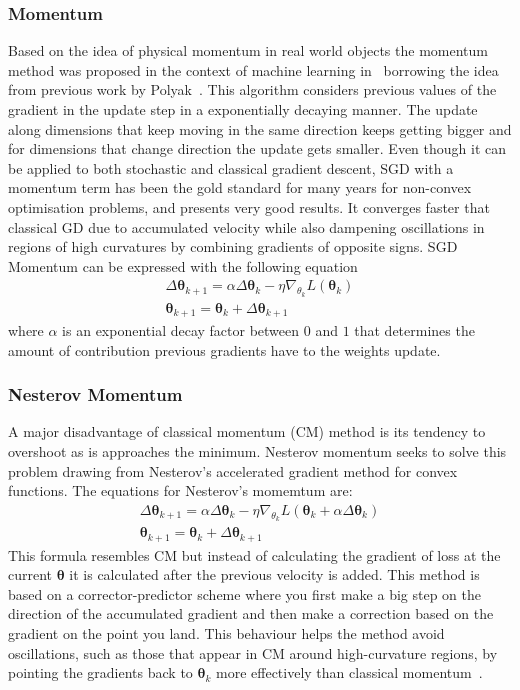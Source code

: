 \documentclass[11pt]{report}
\begin{document}
    \subsubsection{ Momentum }
    Based on the idea of physical momentum in real world objects the momentum method was proposed in the context of machine
    learning in~\cite{rumelhart1986learning} borrowing the idea from previous work by Polyak~\cite{polyak1964some}.
    This algorithm considers previous values of the gradient in the update step in a exponentially decaying manner.
    The update along dimensions that keep moving in the same direction keeps getting bigger and for dimensions that
    change direction the update gets smaller.
    Even though it can be applied to both stochastic and classical gradient descent, SGD with a momentum term has been
    the gold standard for many years for non-convex optimisation problems, and presents very good results.
    It converges faster that classical GD due to accumulated velocity while also dampening oscillations in regions of high
    curvatures by combining gradients of opposite signs.
    SGD Momentum can be expressed with the following equation
    \begin{align*}
        \Delta \pmb\theta_{k+1} = \alpha \Delta \pmb\theta_k - \eta \nabla_{\theta_k} L (\pmb\theta_k) \\
        \pmb\theta_{k+1} = \pmb\theta_{k} + \Delta \pmb\theta_{k+1}
    \end{align*}
    where $\alpha$ is an exponential decay factor between $0$ and $1$ that determines the amount of contribution
    previous gradients have to the weights update.

    \subsubsection{Nesterov Momentum}
    A major disadvantage of classical momentum (CM) method is its tendency to overshoot as is approaches the minimum.
    Nesterov momentum seeks to solve this problem drawing from Nesterov's accelerated gradient method for convex functions.
    The equations for Nesterov's momemtum are:
    \begin{align*}
        \Delta \pmb\theta_{k+1} = \alpha \Delta \pmb\theta_k - \eta \nabla_{\theta_k} L(\pmb\theta_{k} + \alpha \Delta \pmb\theta_{k}) \\
        \pmb\theta_{k+1} = \pmb\theta_{k} + \Delta \pmb\theta_{k+1}
    \end{align*}
    This formula resembles CM but instead of calculating the gradient of loss at the current $\pmb\theta$ it is
    calculated after the previous velocity is added.
    This method is based on a corrector-predictor scheme where you first make a big step on the direction of the
    accumulated gradient and then make a correction based on the gradient on the point you land.
    This behaviour helps the method avoid oscillations, such as those that appear in CM around high-curvature regions,
    by pointing the gradients back to $\pmb\theta_k$ more effectively than classical momentum~\cite{kashyap2022survey}.
\end{document}
